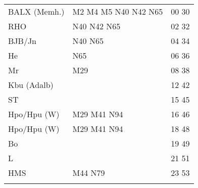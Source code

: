 \begin{tabular}{!{\color{schiefergrau}\vrule width 3pt}*{3}{l!{\color{schiefergrau}\vrule width 3pt}}}
\hline
BALX (Memh.) & \nuzwei{} \nufuenf{} \mtram{} M2 M4 M5 \nbus{} N40 N42 N65 & 00 30 \\
RHO          & \nuzwei{} \nbus{} N40 N42 N65                              & 02 32 \\
BJB/Jn       & \nbus{} N40 N65                                            & 04 34 \\
He           & \nbus{} N65                                                & 06 36 \\
Mr           & \mbus{} M29                                                & 08 38 \\
Kbu (Adalb)  & \nueins{}                                                  & 12 42 \\
ST           &                                                            & 15 45 \\
Hpo/Hpu (W)  & \nusieben{} \mbus{} M29 M41 \nbus{} N94                    & 16 46 \\
\hline
Hpo/Hpu (W)  & \nusieben{} \mbus{} M29 M41 \nbus{} N94                    & 18 48 \\
Bo           &                                                            & 19 49 \\
L            &                                                            & 21 51 \\
HMS          & \mbus{} M44 \nbus{} N79                                    & 23 53 \\
\myhline
\end{tabular}
%
